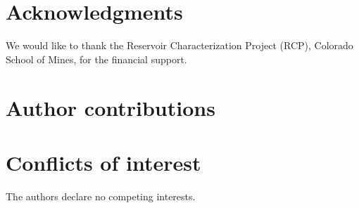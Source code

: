 \section*{Acknowledgments}
We would like to thank the Reservoir Characterization Project (RCP), Colorado School of Mines, for the financial support.

\section*{Author contributions}

\section*{Conflicts of interest}
The authors declare no competing interests.

\printbibliography



